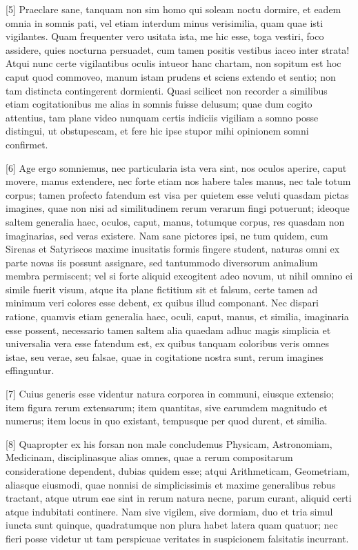 [5] Praeclare sane, tanquam non sim homo qui soleam noctu dormire, et eadem omnia in somnis pati, vel etiam interdum minus verisimilia, quam quae isti vigilantes. Quam frequenter vero usitata ista, me hic esse, toga vestiri, foco assidere, quies nocturna persuadet, cum tamen positis vestibus iaceo inter strata! Atqui nunc certe vigilantibus oculis intueor hanc chartam, non sopitum est hoc caput quod commoveo, manum istam prudens et sciens extendo et sentio; non tam distincta contingerent dormienti. Quasi scilicet non recorder a similibus etiam cogitationibus me alias in somnis fuisse delusum; quae dum cogito attentius, tam plane video nunquam certis indiciis vigiliam a somno posse distingui, ut obstupescam, et fere hic ipse stupor mihi opinionem somni confirmet.

[6] Age ergo somniemus, nec particularia ista vera sint, nos oculos aperire, caput movere, manus extendere, nec forte etiam nos habere tales manus, nec tale totum corpus; tamen profecto fatendum est visa per quietem esse veluti quasdam pictas imagines, quae non nisi ad similitudinem rerum verarum fingi potuerunt; ideoque saltem generalia haec, oculos, caput, manus, totumque corpus, res quasdam non imaginarias, sed veras existere. Nam sane pictores ipsi, ne tum quidem, cum Sirenas et Satyriscos maxime inusitatis formis fingere student, naturas omni ex parte novas iis possunt assignare, sed tantummodo diversorum animalium membra permiscent; vel si forte aliquid excogitent adeo novum, ut nihil omnino ei simile fuerit visum, atque ita plane fictitium sit et falsum, certe tamen ad minimum veri colores esse debent, ex quibus illud componant. Nec dispari ratione, quamvis etiam generalia haec, oculi, caput, manus, et similia, imaginaria esse possent, necessario tamen saltem alia quaedam adhuc magis simplicia et universalia vera esse fatendum est, ex quibus tanquam coloribus veris omnes istae, seu verae, seu falsae, quae in cogitatione nostra sunt, rerum imagines effinguntur.

[7] Cuius generis esse videntur natura corporea in communi, eiusque extensio; item figura rerum extensarum; item quantitas, sive earumdem magnitudo et numerus; item locus in quo existant, tempusque per quod durent, et similia.

[8] Quapropter ex his forsan non male concludemus Physicam, Astronomiam, Medicinam, disciplinasque alias omnes, quae a rerum compositarum consideratione dependent, dubias quidem esse; atqui Arithmeticam, Geometriam, aliasque eiusmodi, quae nonnisi de simplicissimis et maxime generalibus rebus tractant, atque utrum eae sint in rerum natura necne, parum curant, aliquid certi atque indubitati continere. Nam sive vigilem, sive dormiam, duo et tria simul iuncta sunt quinque, quadratumque non plura habet latera quam quatuor; nec fieri posse videtur ut tam perspicuae veritates in suspicionem falsitatis incurrant.

